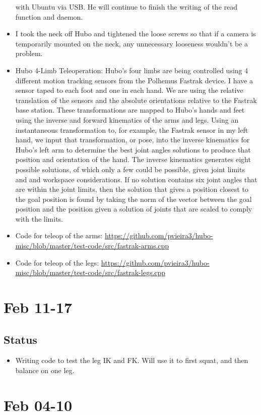 \documentclass[letterpaper, 10 pt]{report}
\begin{document}
\begin{itemize}
with Ubuntu via USB. He will continue to finish the writing of the read function
and daemon.
\item I took the neck off Hubo and tightened the loose screws so that if a camera is
temporarily mounted on the neck, any unnecessary looseness wouldn't be a
problem.
\item Hubo 4-Limb Teleoperation: Hubo's four limbs are being controlled using 4
different motion tracking sensors from the Polhemus Fastrak device. I have a
sensor taped to each foot and one in each hand. We are using the relative
translation of the sensors and the absolute orientations relative to the Fastrak
base station. These transformations are mapped to Hubo's hands and feet using
the inverse and forward kinematics of the arms and legs. Using an instantaneous
transformation to, for example, the Fastrak sensor in my left hand, we input
that transformation, or pose, into the inverse kinematics for Hubo's left arm to
determine the best joint angles solutions to produce that position and
orientation of the hand. The inverse kinematics generates eight possible
solutions, of which only a few could be possible, given joint limits and and
workspace considerations. If no solution contains six joint angles that are
within the joint limits, then the solution that gives a position closest to the
goal position is found by taking the norm of the vector between the goal
position and the position given a solution of joints that are scaled to comply
with the limits.
\item Code for teleop of the arms: \url{https://github.com/pvieira3/hubo-misc/blob/master/test-code/src/fastrak-arms.cpp}
\item Code for teleop of the legs: \url{https://github.com/pvieira3/hubo-misc/blob/master/test-code/src/fastrak-legs.cpp}
\end{itemize}


\section*{Feb 11-17}
\subsection*{Status}
\begin{itemize}
\item Writing code to test the leg IK and FK. Will use it to first squat, and
then balance on one leg.
\end{itemize}

\section*{Feb 04-10}
\end{document}
